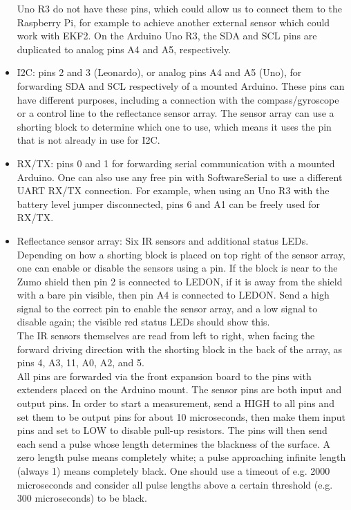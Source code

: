 \documentclass{article}
\begin{document}
\begin{itemize}
        Uno R3 do not have these pins, which could allow us to connect them to 
        the Raspberry Pi, for example to achieve another external sensor which 
        could work with EKF2. On the Arduino Uno R3, the SDA and SCL pins are 
        duplicated to analog pins A4 and A5, respectively.
  \item I2C: pins 2 and 3 (Leonardo), or analog pins A4 and A5 (Uno), for 
        forwarding SDA and SCL respectively of a mounted Arduino. These pins 
        can have different purposes, including a connection with the 
        compass/gyroscope or a control line to the reflectance sensor array. 
        The sensor array can use a shorting block to determine which one to 
        use, which means it uses the pin that is not already in use for I2C.
  \item RX/TX: pins 0 and 1 for forwarding serial communication with a mounted 
        Arduino. One can also use any free pin with SoftwareSerial to use 
        a different UART RX/TX connection. For example, when using an Uno R3 
        with the battery level jumper disconnected, pins 6 and A1 can be freely 
        used for RX/TX.
  \item Reflectance sensor array: Six IR sensors and additional status LEDs. 
        Depending on how a shorting block is placed on top right of the sensor 
        array, one can enable or disable the sensors using a pin. If the block 
        is near to the Zumo shield then pin 2 is connected to LEDON, if it is 
        away from the shield with a bare pin visible, then pin A4 is connected 
        to LEDON. Send a high signal to the correct pin to enable the sensor 
        array, and a low signal to disable again; the visible red status LEDs 
        should show this. \\
        The IR sensors themselves are read from left to right, when facing the 
        forward driving direction with the shorting block in the back of the 
        array, as pins 4, A3, 11, A0, A2, and 5. \\
        All pins are forwarded via the front expansion board to the pins with 
        extenders placed on the Arduino mount. The sensor pins are both input 
        and output pins. In order to start a measurement, send a HIGH to all 
        pins and set them to be output pins for about 10 microseconds, then 
        make them input pins and set to LOW to disable pull-up resistors. The 
        pins will then send each send a pulse whose length determines the 
        blackness of the surface. A zero length pulse means completely white; 
        a pulse approaching infinite length (always 1) means completely black. 
        One should use a timeout of e.g. 2000 microseconds and consider all 
        pulse lengths above a certain threshold (e.g. 300 microseconds) to be 
        black.
\end{itemize}
\end{document}
